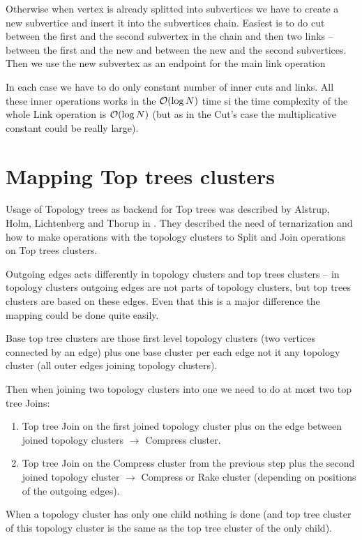 Otherwise when vertex is already splitted into subvertices we have to create
a new subvertice and insert it into the subvertices chain. Easiest is to do cut
between the first and the second subvertex in the chain and then two links --
between the first and the new and between the new and the second subvertices.
Then we use the new subvertex as an endpoint for the main link operation

In each case we have to do only constant number of inner cuts and links. All
these inner operations works in the ${\cal O}(\log N)$ time si the time complexity of
the whole Link operation is ${\cal O}(\log N)$ (but as in the Cut's case the
multiplicative constant could be really large).

\section{Mapping Top trees clusters}

Usage of Topology trees as backend for Top trees was described by Alstrup, Holm,
Lichtenberg and Thorup in \cite{TopTrees}. They described the need of
ternarization and how to make operations with the topology clusters to Split and
Join operations on Top trees clusters.

Outgoing edges acts differently in topology clusters and top trees clusters --
in topology clusters outgoing edges are not parts of topology clusters, but
top trees clusters are based on these edges. Even that this is a major
difference the mapping could be done quite easily.

Base top tree clusters are those first level topology clusters (two vertices
connected by an edge) plus one base cluster per each edge not it any topology
cluster (all outer edges joining topology clusters).


Then when joining two topology clusters into one we need to do at most two
top tree Joins:
\begin{enumerate}
\item Top tree Join on the first joined topology cluster plus on the edge
between joined topology clusters $\rightarrow$ Compress cluster.
\item Top tree Join on the Compress cluster from the previous step plus the second
joined topology cluster $\rightarrow$ Compress or Rake cluster (depending on
positions of the outgoing edges).
\end{enumerate}

When a topology cluster has only one child nothing is done (and top tree cluster
of this topology cluster is the same as the top tree cluster of the only child).

